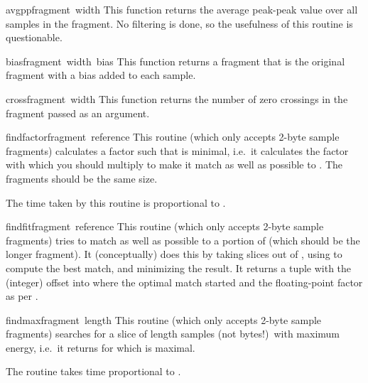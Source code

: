 \begin{funcdesc}{avgpp}{fragment\, width}
This function returns the average peak-peak value over all samples in
the fragment. No filtering is done, so the usefulness of this routine
is questionable.
\end{funcdesc}

\begin{funcdesc}{bias}{fragment\, width\, bias}
This function returns a fragment that is the original fragment with a
bias added to each sample.
\end{funcdesc}

\begin{funcdesc}{cross}{fragment\, width}
This function returns the number of zero crossings in the fragment
passed as an argument.
\end{funcdesc}

\begin{funcdesc}{findfactor}{fragment\, reference}
This routine (which only accepts 2-byte sample fragments) calculates a
factor  such that 
is minimal, i.e.\ it calculates the factor with which you should
multiply  to make it match as well as possible to
. The fragments should be the same size.

The time taken by this routine is proportional to . 
\end{funcdesc}

\begin{funcdesc}{findfit}{fragment\, reference}
This routine (which only accepts 2-byte sample fragments) tries to
match  as well as possible to a portion of
 (which should be the longer fragment). It
(conceptually) does this by taking slices out of , using
 to compute the best match, and minimizing the
result.
It returns a tuple  with  the
(integer) offset into  where the optimal match started
and  the floating-point factor as per .
\end{funcdesc}

\begin{funcdesc}{findmax}{fragment\, length}
This routine (which only accepts 2-byte sample fragments) searches
 for a slice of length  samples (not bytes!)\
with maximum energy, i.e.\ it returns  for which
 is maximal.

The routine takes time proportional to .
\end{funcdesc}

